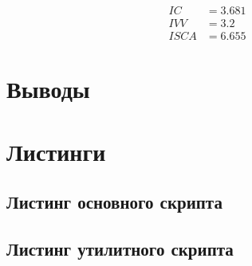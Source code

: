 \begin{align*}
    IC &= 3.681 \\
    IVV &= 3.2 \\
    ISCA &= 6.655
\end{align*}

\clearpage

\section*{Выводы}

%
%
%

\clearpage

\section*{Листинги}

\subsection*{Листинг основного скрипта}


\subsection*{Листинг утилитного скрипта}


